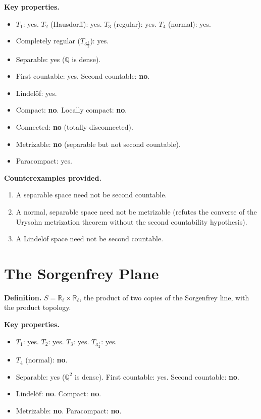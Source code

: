 \documentclass[11pt,a4paper,twoside]{book}
\theoremstyle{remark}
\theoremstyle{definition}
\theoremstyle{definition}
\begin{document}
\medskip
\textbf{Key properties.}
\begin{itemize}
  \item $T_1$: yes. \quad $T_2$ (Hausdorff): yes. \quad $T_3$ (regular): yes. \quad $T_4$ (normal): yes.
  \item Completely regular ($T_{3\frac{1}{2}}$): yes.
  \item Separable: yes ($\mathbb{Q}$ is dense).
  \item First countable: yes. \quad Second countable: \textbf{no}.
  \item Lindel\"of: yes.
  \item Compact: \textbf{no}. \quad Locally compact: \textbf{no}.
  \item Connected: \textbf{no} (totally disconnected).
  \item Metrizable: \textbf{no} (separable but not second countable).
  \item Paracompact: yes.
\end{itemize}

\textbf{Counterexamples provided.}
\begin{enumerate}
  \item A separable space need not be second countable.
  \item A normal, separable space need not be metrizable (refutes the
        converse of the Urysohn metrization theorem without the second
        countability hypothesis).
  \item A Lindel\"of space need not be second countable.
\end{enumerate}

\section{The Sorgenfrey Plane}
\label{app:sorgenfrey-plane}

\textbf{Definition.}
$S = \mathbb{R}_\ell \times \mathbb{R}_\ell$, the product of two
copies of the Sorgenfrey line, with the product topology.

\medskip
\textbf{Key properties.}
\begin{itemize}
  \item $T_1$: yes. \quad $T_2$: yes. \quad $T_3$: yes. \quad $T_{3\frac{1}{2}}$: yes.
  \item $T_4$ (normal): \textbf{no}.
  \item Separable: yes ($\mathbb{Q}^2$ is dense). \quad First countable: yes. \quad Second countable: \textbf{no}.
  \item Lindel\"of: \textbf{no}. \quad Compact: \textbf{no}.
  \item Metrizable: \textbf{no}. \quad Paracompact: \textbf{no}.
\end{itemize}
\end{document}
